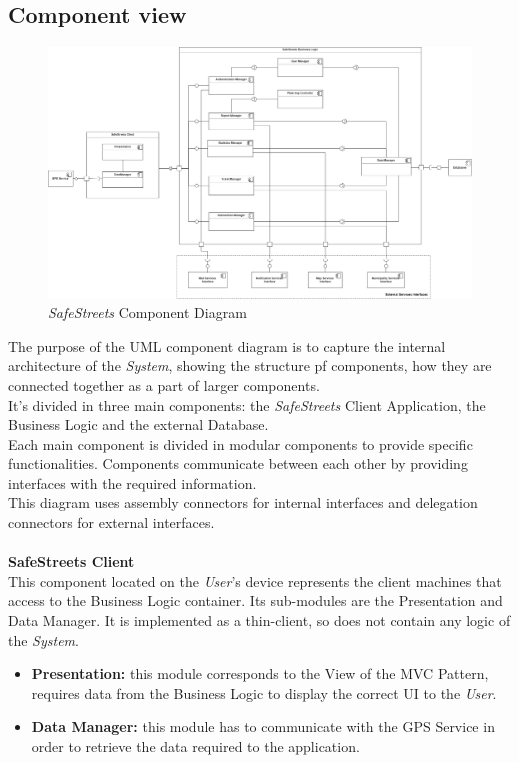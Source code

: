 \documentclass{article}
\begin{document}
	\subsection{Component view}
		\begin{figure}[H]
			\centering
			\includegraphics[scale=0.20]{Images/Diagrams/component_diagram.png}
			\caption{{\it SafeStreets} Component Diagram}
		\end{figure}
		The purpose of the UML component diagram is to capture the internal architecture of the {\it System}, showing the structure pf components, how they are connected together as a part of larger components. \\
		It's divided in three main components: the {\it SafeStreets} Client Application, the Business Logic and the external Database. \\ 
		Each main component is divided in modular components to provide specific functionalities. Components communicate between each other by providing interfaces with the required information. \\
		This diagram uses assembly connectors for internal interfaces and delegation connectors for external interfaces. 
		\\ \\
		{\bf SafeStreets Client} \\
		This component located on the {\it User}'s device represents the client machines that access to the Business Logic container. Its sub-modules are the Presentation and Data Manager. It is implemented as a thin-client, so does not contain any logic of the {\it System}.
		\begin{itemize}
		\item {\bf Presentation:} this module corresponds to the View of the MVC Pattern, requires data from the Business Logic to display the correct UI to the {\it User}.
		\item {\bf Data Manager:} this module has to communicate with the GPS Service in order to retrieve the data required to the application. 
		\end{itemize} 
\end{document}
